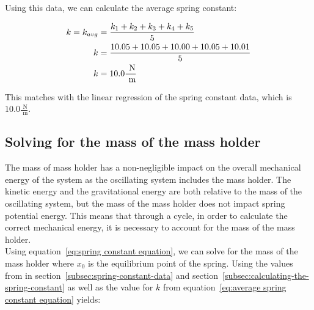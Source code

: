 \documentclass[titlepage]{article}
\begin{document}
            Using this data, we can calculate the average spring constant:
            
            \begin{equation}
                \begin{aligned}
                    \small
                    k = k_{avg} &= \frac{k_1 + k_2 + k_3 + k_4 + k_5}{5} \\
                    k &= \frac{10.05 + 10.05 + 10.00 + 10.05 + 10.01}{5} \\
                    k &= 10.0 \frac{\text{ N}}{\text{ m}} \\
                \end{aligned}\label{eq:average spring constant equation}
            \end{equation} %
            
            This matches with the linear regression of the spring constant data, which is $10.0 \frac{\text{ N}}{\text{ m}}$.
        
        \subsection{Solving for the mass of the mass holder}\label{subsec:solving-for-the-mass-of-the-mass-holder}
            
            The mass of mass holder has a non-negligible impact on the overall mechanical energy of the system as the oscillating system includes the mass holder.
            The kinetic energy and the gravitational energy are both relative to the mass of the oscillating system, but the mass of the mass holder does not impact spring potential energy.
            This means that through a cycle, in order to calculate the correct mechanical energy, it is necessary to account for the mass of the mass holder. \\
            
            Using equation~\ref{eq:spring constant equation}, we can solve for the mass of the mass holder where $x_0$ is the equilibrium point of the spring.
            Using the values from in section~\ref{subsec:spring-constant-data} and section~\ref{subsec:calculating-the-spring-constant} as well as the value for $k$ from equation~\ref{eq:average spring constant equation} yields:
            
\end{document}
